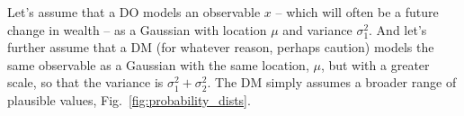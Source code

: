 \documentclass[a4paper, 12pt]{article}
\newcommand{\fref}[1]{Fig.~\ref{fig:#1}}
\newcommand{\ie}{{\it i.e.}\ }
\newcommand{\ND}{\mathcal{N}} %
\begin{document}
%
%

%

Let's assume that a DO models an observable $x$ -- which will often be a future change in wealth -- as a Gaussian with location $\mu$ and variance $\sigma_1^2$. And let's further assume that a DM (for whatever reason, perhaps caution) models the same observable as a Gaussian with the same location, $\mu$, but with a greater scale, so that the variance is $\sigma_1^2+\sigma_2^2$. The DM simply assumes a broader range of plausible values, \fref{probability_dists}.
\end{document}
